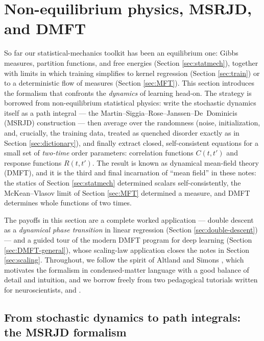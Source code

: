 \documentclass[11pt]{article}
\begin{document}
\section{Non-equilibrium physics, MSRJD, and DMFT}
\label{sec:DMFT}

So far our statistical-mechanics toolkit has been an equilibrium one: Gibbs measures, partition functions, and free energies (Section \ref{sec:statmech}), together with limits in which training simplifies to kernel regression (Section \ref{sec:train}) or to a deterministic flow of measures (Section \ref{sec:MFT}). This section introduces the formalism that confronts the \emph{dynamics} of learning head-on. The strategy is borrowed from non-equilibrium statistical physics: write the stochastic dynamics itself as a path integral --- the Martin--Siggia--Rose--Janssen--De~Dominicis (MSRJD) construction --- then average over the randomness (noise, initialization, and, crucially, the training data, treated as quenched disorder exactly as in Section \ref{sec:dictionary}), and finally extract closed, self-consistent equations for a small set of \emph{two-time} order parameters: correlation functions $C(t,t')$ and response functions $R(t,t')$. The result is known as dynamical mean-field theory (DMFT), and it is the third and final incarnation of ``mean field'' in these notes: the statics of Section \ref{sec:statmech} determined scalars self-consistently, the McKean--Vlasov limit of Section \ref{sec:MFT} determined a measure, and DMFT determines whole functions of two times.

The payoffs in this section are a complete worked application --- double descent as a \emph{dynamical phase transition} in linear regression (Section \ref{sec:double-descent}) --- and a guided tour of the modern DMFT program for deep learning (Section \ref{sec:DMFT-general}), whose scaling-law application closes the notes in Section \ref{sec:scaling}. Throughout, we follow the spirit of Altland and Simons \cite{altlandCondensedMatterField2010}, which motivates the formalism in condensed-matter language with a good balance of detail and intuition, and we borrow freely from two pedagogical tutorials written for neuroscientists, \cite{chowPathIntegralMethods2012} and \cite{stapmannsSelfconsistentFormulationsStochastic2020}.

\subsection{From stochastic dynamics to path integrals: the MSRJD formalism}
\label{sec:MSRJD}
\end{document}
